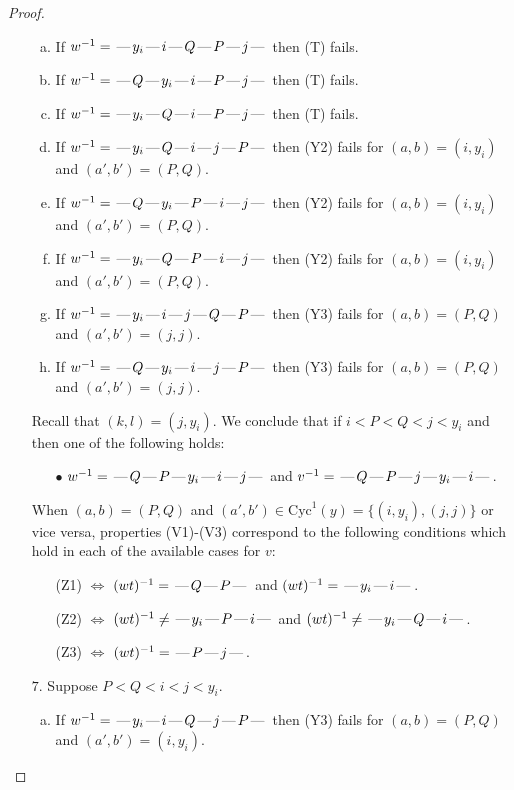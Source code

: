 \documentclass[10pt]{article}
\theoremstyle{definition}
\theoremstyle{definition}
\def\dash{\text{\hspace{0.5mm}---\hspace{0.5mm}}}
\def\Cyc{\mathrm{Cyc}}
\begin{document}
\begin{proof}
\begin{enumerate}
\begin{enumerate}[(a)]
\item If $w^{-1} = \dash y_i\dash i\dash Q\dash P\dash j\dash $ then (T) fails.
\item If $w^{-1} = \dash Q\dash y_i\dash i\dash P\dash j\dash $ then (T) fails.
\item If $w^{-1} = \dash y_i\dash Q\dash i\dash P\dash j\dash $ then (T) fails.
\item If $w^{-1} = \dash y_i\dash Q\dash i\dash j\dash P\dash $ then (Y2) fails for $(a,b)=(i,y_i)$ and $(a',b')=(P,Q)$.
\item If $w^{-1} = \dash Q\dash y_i\dash P\dash i\dash j\dash $ then (Y2) fails for $(a,b)=(i,y_i)$ and $(a',b')=(P,Q)$.
\item If $w^{-1} = \dash y_i\dash Q\dash P\dash i\dash j\dash $ then (Y2) fails for $(a,b)=(i,y_i)$ and $(a',b')=(P,Q)$.
\item If $w^{-1} = \dash y_i\dash i\dash j\dash Q\dash P\dash $ then (Y3) fails for $(a,b)=(P,Q)$ and $(a',b')=(j,j)$.
\item If $w^{-1} = \dash Q\dash y_i\dash i\dash j\dash P\dash $ then (Y3) fails for $(a,b)=(P,Q)$ and $(a',b')=(j,j)$.
\end{enumerate}
Recall that $(k,l) = (j,y_i)$.
We conclude that if $i < P < Q < j < y_i$ and then one of the following holds:
\begin{enumerate}
\item[$\bullet$] $w^{-1} = \dash Q\dash P\dash y_i\dash i\dash j\dash $ and $v^{-1} = \dash Q\dash P\dash j\dash y_i\dash i\dash $.
\end{enumerate}
When $(a,b)= (P,Q)$ and $(a',b')\in \Cyc^1(y)=\{(i,y_i),(j,j)\}$ or vice versa,
properties (V1)-(V3) correspond to the following conditions which hold in
each of the available cases for $v$:
\begin{enumerate}
\item[](Z1) $\Leftrightarrow$ $(wt)^{-1} = \dash Q \dash P \dash$  and $(wt)^{-1} = \dash y_i \dash i \dash$.
\item[](Z2) $\Leftrightarrow$ $(wt)^{-1} \neq \dash y_i \dash P \dash i \dash$ and $(wt)^{-1}\neq \dash y_i \dash Q \dash i \dash$.
\item[](Z3) $\Leftrightarrow$ $(wt)^{-1} = \dash P \dash j \dash$.
\end{enumerate}
\item[$7$.] Suppose $P < Q < i < j < y_i$.
\begin{enumerate}[(a)]
\item If $w^{-1} = \dash y_i\dash i\dash Q\dash j\dash P\dash $ then (Y3) fails for $(a,b)=(P,Q)$ and $(a',b')=(i,y_i)$.

\end{enumerate}
\end{enumerate}
\end{proof}
\end{document}
